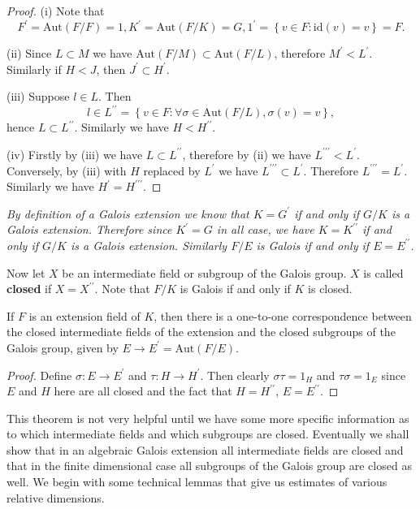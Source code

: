 \begin{proof}
(i) Note that 
$$
F^{\prime}=\mathrm{Aut}\left( F/F \right) =1,K^{\prime}=\mathrm{Aut}\left( F/K \right) =G,1^{\prime}=\left\{ v\in F:\mathrm{id}\left( v \right) =v \right\} =F.
$$\par
(ii) Since $L\subset M$ we have $\mathrm{Aut}(F/M)\subset\mathrm{Aut}(F/L)$, therefore $M^\prime<L^\prime$. Similarly if $H<J$, then $J^\prime\subset H^\prime$.\par
(iii) Suppose $l\in L$. Then 
$$
l\in L^{\prime\prime}=\left\{ v\in F:\forall \sigma \in \mathrm{Aut}\left( F/L \right) ,\sigma \left( v \right) =v \right\} ,
$$
hence $L\subset L^{\prime\prime}$. Similarly we have $H<H^{\prime\prime}$.\par
(iv) Firstly by (iii) we have $L\subset L^{\prime\prime}$, therefore by (ii) we have $L^{\prime\prime\prime}< L^\prime$. Conversely, by (iii) with $H$ replaced by $L^\prime$ we have $L^{\prime\prime\prime}\subset L^\prime$. Therefore $L^{\prime\prime\prime}=L^\prime$. Similarly we have $H^\prime=H^{\prime\prime\prime}$.
\end{proof}
\begin{note}\em
By definition of a Galois extension we know that $K=G^\prime$ if and only if $G/K$ is a Galois extension. Therefore since $K^\prime=G$ in all case, we have $K=K^{\prime\prime}$ if and only if $G/K$ is a Galois extension. Similarly $F/E$ is Galois if and only if $E=E^{\prime\prime}$.
\end{note}
Now let $X$ be an intermediate field or subgroup of the Galois group. $X$ is called \textbf{closed} if $X=X^{\prime\prime}$. Note that $F/K$ is Galois if and only if $K$ is closed.
\begin{theorem}
If $F$ is an extension field of $K$, then there is a one-to-one correspondence between the closed intermediate fields of the extension and the closed subgroups of the Galois group, given by $E\to E^\prime=\mathrm{Aut}(F/E)$.
\end{theorem}
\begin{proof}
Define $\sigma:E\to E^\prime$ and $\tau:H\to H^\prime$. Then clearly $\sigma\tau=1_H$ and $\tau\sigma=1_E$ since $E$ and $H$ here are all closed and the fact that $H=H^{\prime\prime}$, $E=E^{\prime\prime}$.
\end{proof}
This theorem is not very helpful until we have some more specific information as to which intermediate fields and which subgroups are closed. Eventually we shall show that in an algebraic Galois extension all intermediate fields are closed and that in the finite dimensional case all subgroups of the Galois group are closed as well. We begin with some technical lemmas that give us estimates of various relative dimensions.
